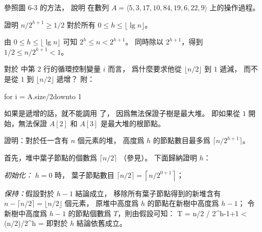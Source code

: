 \startsection[
  title={Building heap},
]

\startEXERCISE
參照圖 6-3 的方法，
說明  在數列 $A = \langle 5, 3, 17, 10, 84, 19, 6, 22, 9 \rangle$ 上的操作過程。
\stopEXERCISE

\startANSWER
\startcombination[3*2]
{\externalfigure[output/e6_3_1-1]}{}
{\externalfigure[output/e6_3_1-2]}{}
{\externalfigure[output/e6_3_1-3]}{}
{\externalfigure[output/e6_3_1-4]}{}
{\externalfigure[output/e6_3_1-5]}{}
{}{}
\stopcombination
\stopANSWER

\startEXERCISE
證明 $n/2^{h+1} \ge 1/2$ 對於所有 $0\le h\le \lfloor \lg n\rfloor$。
\stopEXERCISE

\startANSWER
由 $0\le h\le \lfloor \lg n\rfloor$ 可知 $2^h \le n < 2^{h+1}$。
同時除以 $2^{h+1}$，得到 $1/2 \le n/2^{h+1} < 1$。
\stopANSWER

\startEXERCISE
對於  中第 2 行的循環控制變量 $i$ 而言，
爲什麼要求他從 $\lfloor n/2 \rfloor$ 到 $1$ 遞減，
而不是從 $1$ 到 $\lfloor n/2 \rfloor$ 遞增？
附：

\startCLRSCODE
for i = \lfloor A.size/2\rfloor downto 1
\stopCLRSCODE
\stopEXERCISE

\startANSWER
如果是遞增的話，就不能調用  了，
因爲無法保證子樹是最大堆。
即如果從 $1$ 開始，無法保證 $A[2]$ 和 $A[3]$ 是最大堆的根節點。
\stopANSWER

\startEXERCISE
證明：對於任一含有 $n$ 個元素的堆，
高度爲 $h$ 的節點數目最多爲 $\lceil n/2^{h+1} \rceil$。
\stopEXERCISE

\startANSWER
首先，堆中葉子節點的個數爲 $\lceil n/2 \rceil$ （參見）。
下面歸納證明 $h$：

\emph{初始化：} $h = 0$ 時，
葉子節點數目 $\lceil n/2 \rceil = \left\lceil n/2^{0+1} \right\rceil$；

\emph{保持：}假設對於 $h - 1$ 結論成立，
移除所有葉子節點得到的新堆含有 $n-\lceil n/2 \rceil = \lfloor n/2 \rfloor$ 個元素，
原堆中高度爲 $h$ 的節點在新樹中高度爲 $h-1$；
令新樹中高度爲 $h-1$ 的節點個數爲 $T$，則由假設可知：
\startsplitformula\startmathalignment
\NC T \NC = \lceil \lfloor n/2 \rfloor / 2^{h-1+1} \rceil \NR
\NC \NC < \lceil (n/2)/2^h \rceil \NR
\NC \NC = \left\lceil {} \right\rceil \NR
\stopmathalignment\stopsplitformula
即對於 $h$ 結論依舊成立。
\stopANSWER

\stopsection

